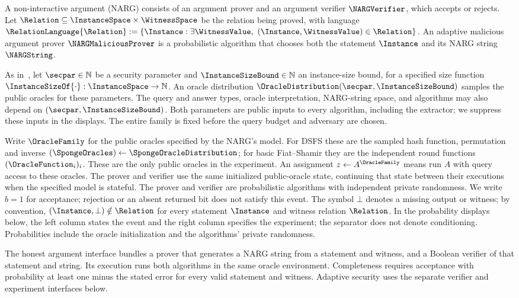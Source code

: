 A non-interactive argument (NARG) consists of an argument prover and an argument verifier \(\NARGVerifier\), which accepts or rejects. Let \(\Relation\subseteq\InstanceSpace\times\WitnessSpace\) be the relation being proved, with language \(\RelationLanguage{\Relation}:=\{\Instance:\exists\WitnessValue,\ (\Instance,\WitnessValue)\in\Relation\}\). An adaptive malicious argument prover \(\NARGMaliciousProver\) is a probabilistic algorithm that chooses both the statement \(\Instance\) and its NARG string \(\NARGString\).

As in~\cite[Section~9.1]{snarg-book}, let \(\secpar\in\mathbb N\) be a security parameter and \(\InstanceSizeBound\in\mathbb N\) an instance-size bound, for a specified size function \(\InstanceSizeOf{\cdot}:\InstanceSpace\to\mathbb N\). An oracle distribution \(\OracleDistribution(\secpar,\InstanceSizeBound)\) samples the public oracles for these parameters. The query and answer types, oracle interpretation, NARG-string space, and algorithms may also depend on \((\secpar,\InstanceSizeBound)\). Both parameters are public inputs to every algorithm, including the extractor; we suppress these inputs in the displays. The entire family is fixed before the query budget and adversary are chosen.

Write \(\OracleFamily\) for the public oracles specified by the NARG's model. For DSFS these are the sampled hash function, permutation and inverse \((\SpongeOracles)\leftarrow\SpongeOracleDistribution\); for basic Fiat--Shamir they are the independent round functions \((\OracleFunction_i)_i\). These are the only public oracles in the experiment. An assignment \(z\leftarrow A^{\OracleFamily}\) means run \(A\) with query access to these oracles. The prover and verifier use the same initialized public-oracle state, continuing that state between their executions when the specified model is stateful. The prover and verifier are probabilistic algorithms with independent private randomness. We write \(b=1\) for acceptance; rejection or an absent returned bit does not satisfy this event. The symbol \(\bot\) denotes a missing output or witness; by convention, \((\Instance,\bot)\notin\Relation\) for every statement \(\Instance\) and witness relation \(\Relation\). In the probability displays below, the left column states the event and the right column specifies the experiment; the separator does not denote conditioning. Probabilities include the oracle initialization and the algorithms' private randomness.

\begin{remark}
\label{rem:honest_argument_interface}
The honest argument interface bundles a prover that generates a NARG string from a statement
and witness, and a Boolean verifier of that statement and string. Its execution runs both
algorithms in the same oracle environment. Completeness requires acceptance with probability
at least one minus the stated error for every valid statement and witness. Adaptive security
uses the separate verifier and experiment interfaces below.
\leanok
\end{remark}

